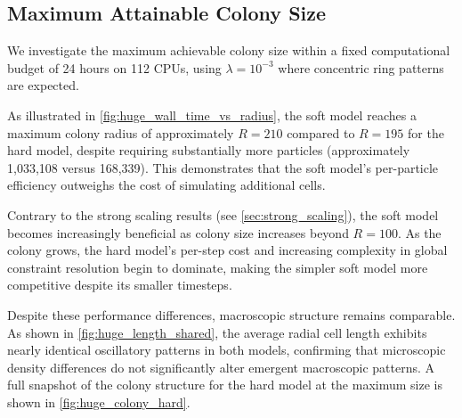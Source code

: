 \documentclass[conference]{IEEEtran}
\begin{document}
\subsection{Maximum Attainable Colony Size}

We investigate the maximum achievable colony size within a fixed computational budget of 24 hours on 112 CPUs, using $\lambda = 10^{-3}$ where concentric ring patterns are expected.

As illustrated in \autoref{fig:huge_wall_time_vs_radius}, the soft model reaches a maximum colony radius of approximately $R = 210$ compared to $R = 195$ for the hard model, despite requiring substantially more particles (approximately 1,033,108 versus 168,339). This demonstrates that the soft model's per-particle efficiency outweighs the cost of simulating additional cells.

Contrary to the strong scaling results (see \autoref{sec:strong_scaling}), the soft model becomes increasingly beneficial as colony size increases beyond $R = 100$. As the colony grows, the hard model's per-step cost and increasing complexity in global constraint resolution begin to dominate, making the simpler soft model more competitive despite its smaller timesteps.

Despite these performance differences, macroscopic structure remains comparable. As shown in \autoref{fig:huge_length_shared}, the average radial cell length exhibits nearly identical oscillatory patterns in both models, confirming that microscopic density differences do not significantly alter emergent macroscopic patterns. A full snapshot of the colony structure for the hard model at the maximum size is shown in \autoref{fig:huge_colony_hard}.
\end{document}
